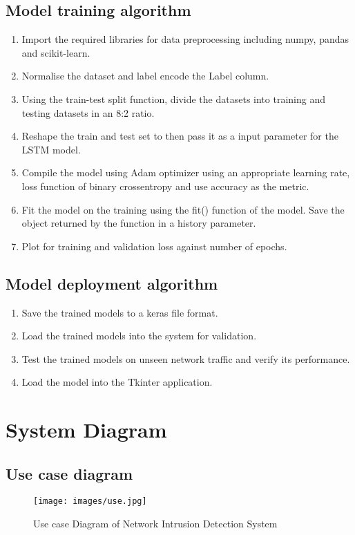 \subsection{Model training algorithm}
\vspace{-18pt}
\begin{enumerate}[label=\roman*.]
	\item Import the required libraries for data preprocessing including numpy, pandas and scikit-learn.
	\item Normalise the dataset and label encode the Label column.
	\item Using the train-test split function, divide the datasets into training and testing datasets in an 8:2 ratio.
	\item Reshape the train and test set to then pass it as a input parameter for the LSTM model.
	\item Compile the model using Adam optimizer using an appropriate learning rate, loss function of binary crossentropy and use accuracy as the metric.
	\item Fit the model on the training using the fit() function of the model. Save the object returned by the function in a history parameter.
	\item  Plot for training and validation loss against number of epochs.
\end{enumerate}
\subsection{Model deployment algorithm}
\vspace{-18pt}
\begin{enumerate}[label=\roman*.]
	\item Save the trained models to a keras file format. 
	\item Load the trained models into the system for validation.
	\item Test the trained models on unseen network traffic and verify its performance.
	\item Load the model into the Tkinter application.
\end{enumerate}
\section{System Diagram}
\vspace{-18pt}
\subsection{Use case diagram}
\begin{figure}[h]
\begin{center}
	\texttt{[image: images/use.jpg]} 
	\caption{Use case Diagram of Network Intrusion Detection System} %
	\label{Use case Diagram of Network Intrusion Detection System} %
\end{center}
\end{figure}
\newpage
